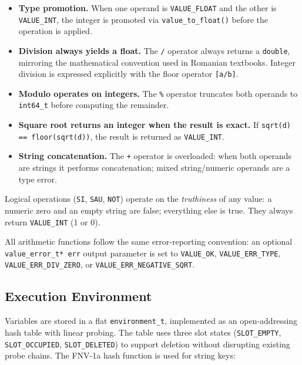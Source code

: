 \begin{itemize}
  \item \textbf{Type promotion.}  When one operand is \texttt{VALUE\_FLOAT}
        and the other is \texttt{VALUE\_INT}, the integer is promoted via
        \texttt{value\_to\_float()} before the operation is applied.
  \item \textbf{Division always yields a float.}
        The \texttt{/} operator always returns a \texttt{double}, mirroring
        the mathematical convention used in Romanian textbooks.  Integer
        division is expressed explicitly with the floor operator \texttt{[a/b]}.
  \item \textbf{Modulo operates on integers.}
        The \texttt{\%} operator truncates both operands to \texttt{int64\_t}
        before computing the remainder.
  \item \textbf{Square root returns an integer when the result is exact.}
        If \texttt{sqrt(d) == floor(sqrt(d))}, the result is returned as
        \texttt{VALUE\_INT}.
  \item \textbf{String concatenation.}
        The \texttt{+} operator is overloaded: when both operands are strings
        it performs concatenation; mixed string/numeric operands are a
        type error.
\end{itemize}

Logical operations (\texttt{SI}, \texttt{SAU}, \texttt{NOT}) operate on the
\emph{truthiness} of any value: a numeric zero and an empty string are false;
everything else is true.  They always return \texttt{VALUE\_INT} (1 or 0).

All arithmetic functions follow the same error-reporting convention: an
optional \texttt{value\_error\_t* err} output parameter is set to
\texttt{VALUE\_OK}, \texttt{VALUE\_ERR\_TYPE}, \texttt{VALUE\_ERR\_DIV\_ZERO},
or \texttt{VALUE\_ERR\_NEGATIVE\_SQRT}.

\subsection{Execution Environment}
\label{subsec:environment}

Variables are stored in a flat \texttt{environment\_t}, implemented as an
open-addressing hash table with linear probing.  The table uses three slot
states (\texttt{SLOT\_EMPTY}, \texttt{SLOT\_OCCUPIED}, \texttt{SLOT\_DELETED})
to support deletion without disrupting existing probe chains.  The FNV-1a hash
function \cite{fnv-hash} is used for string keys:

